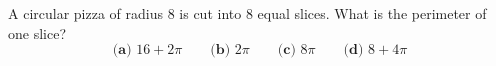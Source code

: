 A circular pizza of radius $8$ is cut into $8$ equal slices. What is the perimeter of one slice?
\[
\textbf{(a) } 16+2\pi\qquad\textbf{(b) } 2\pi\qquad\textbf{(c) } 8\pi\qquad\textbf{(d) } 8+4\pi
\]
